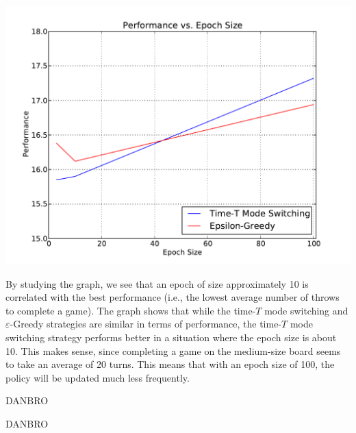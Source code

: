 \documentclass[solution, letterpaper]{cs121}
\begin{document}
\begin{center}
\includegraphics[scale=0.8]{source/perf-v-epoch-size.pdf}
\end{center}

By studying the graph, we see that an epoch of size approximately 10 is correlated with the best performance (i.e., the lowest average number of throws to complete a game). The graph shows that while the time-$T$ mode switching and $\varepsilon$-Greedy strategies are similar in terms of performance, the time-$T$ mode switching strategy performs better in a situation where the epoch size is about 10. This makes sense, since completing a game on the medium-size board seems to take an average of 20 turns. This means that with an epoch size of 100, the policy will be updated much less frequently. 

\subproblem{} %
DANBRO

\subproblem{} %
DANBRO
\end{document}
